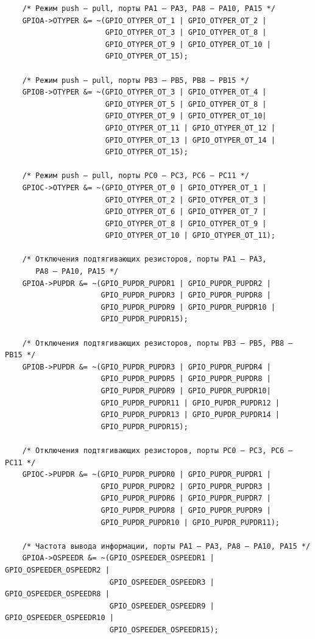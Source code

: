 \begin{verbatim}
    /* Режим push – pull, порты PA1 – PA3, PA8 – PA10, PA15 */                 
    GPIOA->OTYPER &= ~(GPIO_OTYPER_OT_1 | GPIO_OTYPER_OT_2 |
                       GPIO_OTYPER_OT_3 | GPIO_OTYPER_OT_8 |
                       GPIO_OTYPER_OT_9 | GPIO_OTYPER_OT_10 |
                       GPIO_OTYPER_OT_15);
    
    /* Режим push – pull, порты PB3 – PB5, PB8 – PB15 */
    GPIOB->OTYPER &= ~(GPIO_OTYPER_OT_3 | GPIO_OTYPER_OT_4 | 
                       GPIO_OTYPER_OT_5 | GPIO_OTYPER_OT_8 | 
                       GPIO_OTYPER_OT_9 | GPIO_OTYPER_OT_10| 
                       GPIO_OTYPER_OT_11 | GPIO_OTYPER_OT_12 |
                       GPIO_OTYPER_OT_13 | GPIO_OTYPER_OT_14 | 
                       GPIO_OTYPER_OT_15);
    
    /* Режим push – pull, порты PC0 – PC3, PC6 – PC11 */
    GPIOC->OTYPER &= ~(GPIO_OTYPER_OT_0 | GPIO_OTYPER_OT_1 | 
                       GPIO_OTYPER_OT_2 | GPIO_OTYPER_OT_3 |
                       GPIO_OTYPER_OT_6 | GPIO_OTYPER_OT_7 | 
                       GPIO_OTYPER_OT_8 | GPIO_OTYPER_OT_9 |  
                       GPIO_OTYPER_OT_10 | GPIO_OTYPER_OT_11);
    
    /* Отключения подтягивающих резисторов, порты PA1 – PA3, 
       PA8 – PA10, PA15 */
    GPIOA->PUPDR &= ~(GPIO_PUPDR_PUPDR1 | GPIO_PUPDR_PUPDR2 |
                      GPIO_PUPDR_PUPDR3 | GPIO_PUPDR_PUPDR8 |
                      GPIO_PUPDR_PUPDR9 | GPIO_PUPDR_PUPDR10 |
                      GPIO_PUPDR_PUPDR15);

    /* Отключения подтягивающих резисторов, порты PB3 – PB5, PB8 – PB15 */
    GPIOB->PUPDR &= ~(GPIO_PUPDR_PUPDR3 | GPIO_PUPDR_PUPDR4 | 
                      GPIO_PUPDR_PUPDR5 | GPIO_PUPDR_PUPDR8 | 
                      GPIO_PUPDR_PUPDR9 | GPIO_PUPDR_PUPDR10| 
                      GPIO_PUPDR_PUPDR11 | GPIO_PUPDR_PUPDR12 |
                      GPIO_PUPDR_PUPDR13 | GPIO_PUPDR_PUPDR14 | 
                      GPIO_PUPDR_PUPDR15);

    /* Отключения подтягивающих резисторов, порты PC0 – PC3, PC6 – PC11 */
    GPIOC->PUPDR &= ~(GPIO_PUPDR_PUPDR0 | GPIO_PUPDR_PUPDR1 | 
                      GPIO_PUPDR_PUPDR2 | GPIO_PUPDR_PUPDR3 |
                      GPIO_PUPDR_PUPDR6 | GPIO_PUPDR_PUPDR7 | 
                      GPIO_PUPDR_PUPDR8 | GPIO_PUPDR_PUPDR9 |  
                      GPIO_PUPDR_PUPDR10 | GPIO_PUPDR_PUPDR11);
    
    /* Частота вывода информации, порты PA1 – PA3, PA8 – PA10, PA15 */
    GPIOA->OSPEEDR &= ~(GPIO_OSPEEDER_OSPEEDR1 | GPIO_OSPEEDER_OSPEEDR2 |
                        GPIO_OSPEEDER_OSPEEDR3 | GPIO_OSPEEDER_OSPEEDR8 |
                        GPIO_OSPEEDER_OSPEEDR9 | GPIO_OSPEEDER_OSPEEDR10 |
                        GPIO_OSPEEDER_OSPEEDR15);


\end{verbatim}
